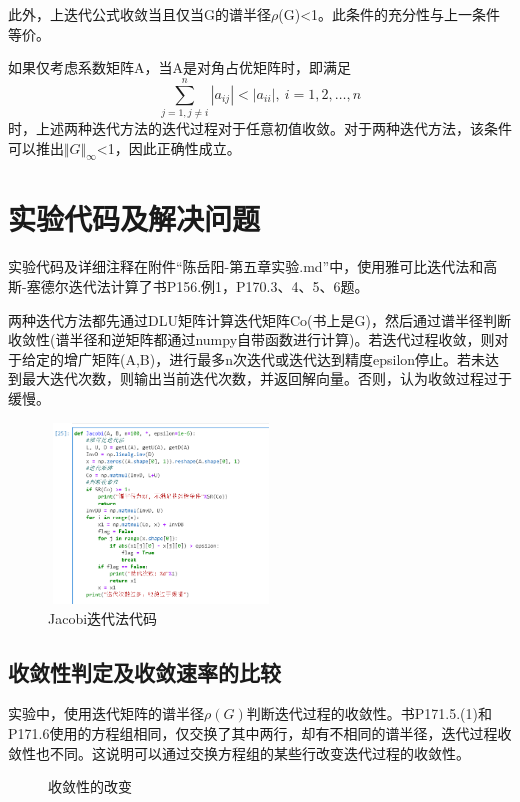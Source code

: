 \documentclass{article}
\begin{document}
此外，上迭代公式收敛当且仅当G的谱半径$\rho$(G)<1。此条件的充分性与上一条件等价。

如果仅考虑系数矩阵A，当A是对角占优矩阵时，即满足
$$
\sum\limits_{j=1,j\neq i}^n|a_{ij}|<|a_{ii}|,\ i=1,2,\dots,n
$$
时，上述两种迭代方法的迭代过程对于任意初值收敛。对于两种迭代方法，该条件可以推出$\Vert G\Vert_\infty$<1，因此正确性成立。

\section{实验代码及解决问题}
	实验代码及详细注释在附件“陈岳阳-第五章实验.md”中，使用雅可比迭代法和高斯-塞德尔迭代法计算了书P156.例1，P170.3、4、5、6题。

	两种迭代方法都先通过DLU矩阵计算迭代矩阵Co(书上是G)，然后通过谱半径判断收敛性(谱半径和逆矩阵都通过numpy自带函数进行计算)。若迭代过程收敛，则对于给定的增广矩阵(A,B)，进行最多n次迭代或迭代达到精度epsilon停止。若未达到最大迭代次数，则输出当前迭代次数，并返回解向量。否则，认为收敛过程过于缓慢。
\begin{figure}[tbp]
\centering
\includegraphics[width=6cm,height=4.8cm]{Jacobi.png}
\caption{Jacobi迭代法代码}
\end{figure}
\newpage
\subsection{收敛性判定及收敛速率的比较}
	实验中，使用迭代矩阵的谱半径$\rho(G)$判断迭代过程的收敛性。书P171.5.(1)和P171.6使用的方程组相同，仅交换了其中两行，却有不相同的谱半径，迭代过程收敛性也不同。这说明可以通过交换方程组的某些行改变迭代过程的收敛性。

\begin{figure}
	\centering
	\caption{收敛性的改变}
\end{figure}
\end{document}
